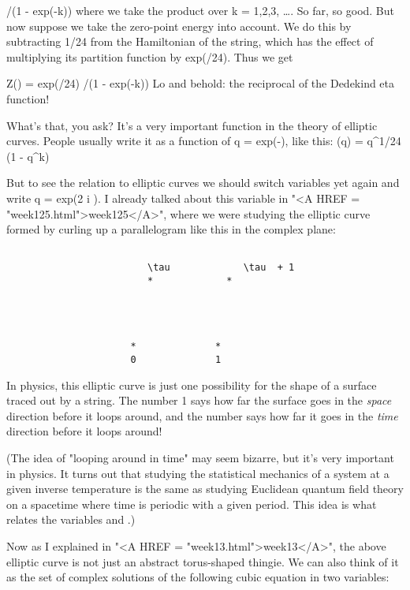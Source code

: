               /(1 - exp(-\beta k))
where we take the product over k = 1,2,3, \ldots .
So far, so good.  But now suppose we take the zero-point energy into
account.  We do this by subtracting 1/24 from the Hamiltonian of the
string, which has the effect of multiplying its partition function by 
exp(\beta /24).  Thus we get

         Z(\beta )  =  exp(\beta /24)  /(1 - exp(-\beta k))
Lo and behold: the reciprocal of the Dedekind eta function!  

What's that, you ask?  It's a very important function in the theory of
elliptic curves.  People usually write it as a function of q = exp(-\beta ),
like this:
                 \eta (q) = 
q^{1/24} \prod  (1 - q^{k})

But to see the relation to elliptic curves we should switch variables
yet again and write q = exp(2 \pi  i \tau ).  I already talked about this
variable \tau  in "<A HREF = "week125.html">week125</A>", where we were studying the elliptic curve
formed by curling up a parallelogram like this in the complex plane:


\begin{verbatim}

                         \tau             \tau  + 1 
                         *             *




                      *              *
                      0              1
\end{verbatim}
    

In physics, this elliptic curve is just one possibility for the shape of
a surface traced out by a string.  The number 1 says how far the surface
goes in the \emph{space} direction before it loops around, and the number 
\tau 
says how far it goes in the \emph{time} direction before it loops around!

(The idea of "looping around in time" may seem bizarre, but
it's very important in physics.  It turns out that studying the
statistical mechanics of a system at a given inverse temperature is the
same as studying Euclidean quantum field theory on a spacetime where
time is periodic with a given period.  This idea is what relates the
variables \beta  and \tau .)

Now as I explained in "<A HREF = "week13.html">week13</A>", the above elliptic curve is not just
an abstract torus-shaped thingie.  We can also think of it as the set of
complex solutions of the following cubic equation in two variables:

